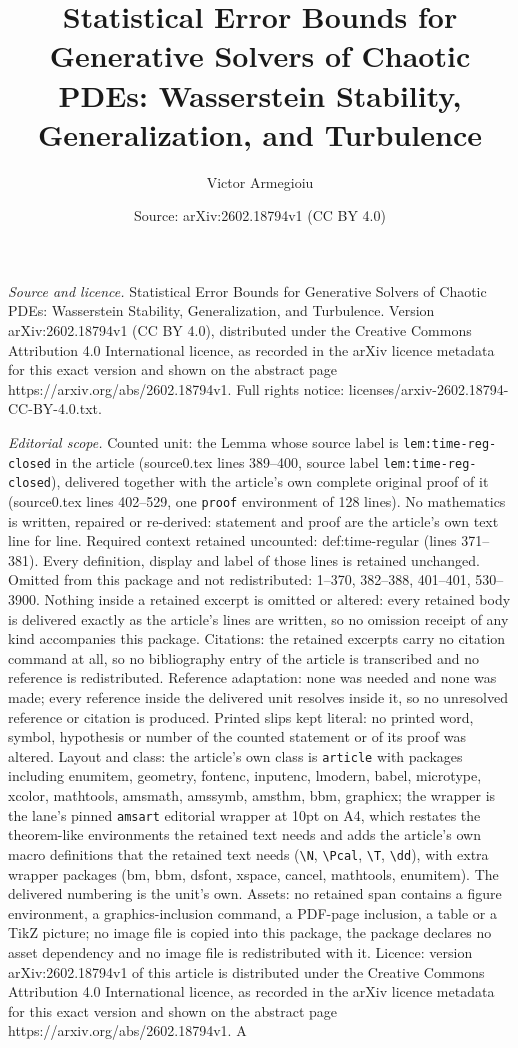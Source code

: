\documentclass[10pt,a4paper]{amsart}
\title[Statistical Error Bounds for Generative Solvers of Chaotic P]{Statistical Error Bounds for Generative Solvers of Chaotic PDEs: Wasserstein Stability, Generalization, and Turbulence}
\author{Victor Armegioiu}
\date{Source: arXiv:2602.18794v1 (CC BY 4.0)}
\begin{document}
\maketitle

\noindent\emph{Source and licence.} Statistical Error Bounds for Generative Solvers of Chaotic PDEs: Wasserstein Stability, Generalization, and Turbulence. Version arXiv:2602.18794v1 (CC BY 4.0), distributed under the Creative Commons Attribution 4.0 International licence, as recorded in the arXiv licence metadata for this exact version and shown on the abstract page https://arxiv.org/abs/2602.18794v1. Full rights notice: licenses/arxiv-2602.18794-CC-BY-4.0.txt.\par\smallskip

\noindent\textit{Editorial scope.} Counted unit: the Lemma whose source label is \texttt{lem:time-reg-closed} in the article (source0.tex lines 389--400, source label \texttt{lem:time-reg-closed}), delivered together with the article's own complete original proof of it (source0.tex lines 402--529, one \texttt{proof} environment of 128 lines). No mathematics is written, repaired or re-derived: statement and proof are the article's own text line for line. Required context retained uncounted: def:time-regular (lines 371--381). Every definition, display and label of those lines is retained unchanged. Omitted from this package and not redistributed: 1--370, 382--388, 401--401, 530--3900. Nothing inside a retained excerpt is omitted or altered: every retained body is delivered exactly as the article's lines are written, so no omission receipt of any kind accompanies this package. Citations: the retained excerpts carry no citation command at all, so no bibliography entry of the article is transcribed and no reference is redistributed. Reference adaptation: none was needed and none was made; every reference inside the delivered unit resolves inside it, so no unresolved reference or citation is produced. Printed slips kept literal: no printed word, symbol, hypothesis or number of the counted statement or of its proof was altered. Layout and class: the article's own class is \texttt{article} with packages including enumitem, geometry, fontenc, inputenc, lmodern, babel, microtype, xcolor, mathtools, amsmath, amssymb, amsthm, bbm, graphicx; the wrapper is the lane's pinned \texttt{amsart} editorial wrapper at 10pt on A4, which restates the theorem-like environments the retained text needs and adds the article's own macro definitions that the retained text needs (\texttt{\textbackslash N}, \texttt{\textbackslash Pcal}, \texttt{\textbackslash T}, \texttt{\textbackslash dd}), with extra wrapper packages (bm, bbm, dsfont, xspace, cancel, mathtools, enumitem). The delivered numbering is the unit's own. Assets: no retained span contains a figure environment, a graphics-inclusion command, a PDF-page inclusion, a table or a TikZ picture; no image file is copied into this package, the package declares no asset dependency and no image file is redistributed with it. Licence: version arXiv:2602.18794v1 of this article is distributed under the Creative Commons Attribution 4.0 International licence, as recorded in the arXiv licence metadata for this exact version and shown on the abstract page https://arxiv.org/abs/2602.18794v1. A 
\end{document}
